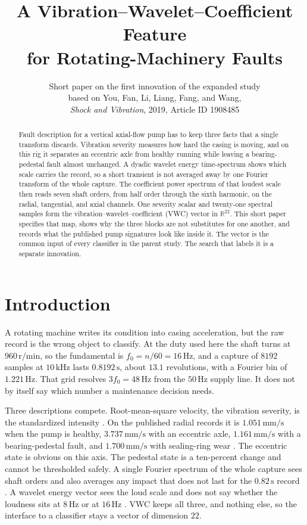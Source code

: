 \documentclass[11pt,a4paper]{article}
\title{\textbf{A Vibration--Wavelet--Coefficient Feature\\ for Rotating-Machinery Faults}}
\author{Short paper on the first innovation of the expanded study\\
based on You, Fan, Li, Liang, Fang, and Wang,\\
\textit{Shock and Vibration}, 2019, Article ID 1908485}
\date{}
\begin{document}
\maketitle
\thispagestyle{empty}
\vspace{-1.6em}

\begin{abstract}
\noindent
Fault description for a vertical axial-flow pump has to keep three facts that a single transform discards.
Vibration severity measures how hard the casing is moving, and on this rig it separates an eccentric axle from healthy running while leaving a bearing-pedestal fault almost unchanged.
A dyadic wavelet energy time-spectrum shows which scale carries the record, so a short transient is not averaged away by one Fourier transform of the whole capture.
The coefficient power spectrum of that loudest scale then reads seven shaft orders, from half order through the sixth harmonic, on the radial, tangential, and axial channels.
One severity scalar and twenty-one spectral samples form the vibration--wavelet--coefficient (VWC) vector in $\mathbb{R}^{22}$.
This short paper specifies that map, shows why the three blocks are not substitutes for one another, and records what the published pump signatures look like inside it.
The vector is the common input of every classifier in the parent study.
The search that labels it is a separate innovation.
\end{abstract}

\section{Introduction}

A rotating machine writes its condition into casing acceleration, but the raw record is the wrong object to classify.
At the duty used here the shaft turns at $960\,\mathrm{r/min}$, so the fundamental is $f_0=n/60=16\,\mathrm{Hz}$, and a capture of $8192$ samples at $10\,\mathrm{kHz}$ lasts $0.8192\,\mathrm{s}$, about $13.1$ revolutions, with a Fourier bin of $1.221\,\mathrm{Hz}$.
That grid resolves $3f_0=48\,\mathrm{Hz}$ from the $50\,\mathrm{Hz}$ supply line.
It does not by itself say which number a maintenance decision needs.

Three descriptions compete.
Root-mean-square velocity, the vibration severity, is the standardized intensity \cite{iso20816}.
On the published radial records it is $1.051\,\mathrm{mm/s}$ when the pump is healthy, $3.737\,\mathrm{mm/s}$ with an eccentric axle, $1.161\,\mathrm{mm/s}$ with a bearing-pedestal fault, and $1.700\,\mathrm{mm/s}$ with sealing-ring wear \cite{you2019}.
The eccentric state is obvious on this axis.
The pedestal state is a ten-percent change and cannot be thresholded safely.
A single Fourier spectrum of the whole capture sees shaft orders and also averages any impact that does not last for the $0.82\,\mathrm{s}$ record \cite{peng2004}.
A wavelet energy vector sees the loud scale and does not say whether the loudness sits at $8\,\mathrm{Hz}$ or at $16\,\mathrm{Hz}$ \cite{mallat1989}.
VWC keeps all three, and nothing else, so the interface to a classifier stays a vector of dimension $22$.
\end{document}
